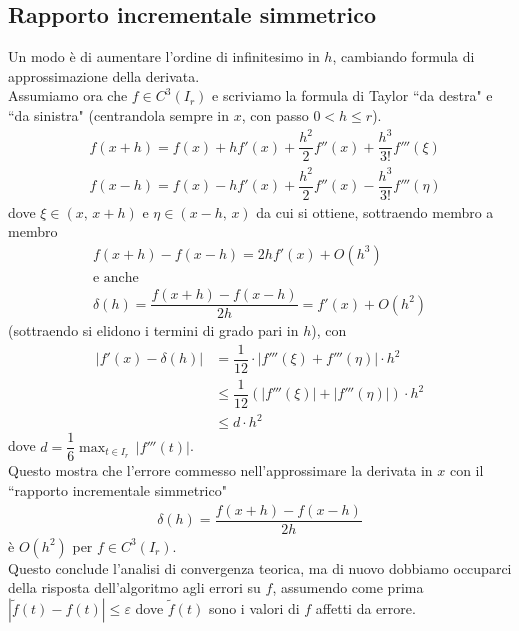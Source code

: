 \documentclass[12pt,a4paper]{article}
\begin{document}
\subsection{Rapporto incrementale simmetrico}
Un modo è di aumentare l'ordine di infinitesimo in $h$, cambiando formula di approssimazione della derivata.\\
Assumiamo ora che $f\in C^3(I_r)$ e scriviamo la formula di Taylor ``da destra" e ``da sinistra" (centrandola sempre in $x$, con passo $0<h\leq r$).
\[ \begin{split}
	& f(x+h)=f(x)+hf'(x)+\dfrac{h^2}{2}f''(x)+\dfrac{h^3}{3!}f'''(\xi) \\
	& f(x-h)=f(x)-hf'(x)+\dfrac{h^2}{2}f''(x)-\dfrac{h^3}{3!}f'''(\eta)
\end{split} \]
dove $\xi \in (x, \, x+h)$ e $\eta \in (x-h, \, x)$ da cui si ottiene, sottraendo membro a membro
\begin{gather*}
	f(x+h)-f(x-h)=2hf'(x)+O(h^3)\\
	\text{e anche}\\
	\delta (h) = \dfrac{f(x+h)-f(x-h)}{2h} = f'(x) + O(h^2)
\end{gather*} 
(sottraendo si elidono i termini di grado pari in $h$), con
\begin{align*}
	\left|f'(x)-\delta(h)\right|& =\dfrac{1}{12}\cdot \left|f'''(\xi)+f'''(\eta)\right|\cdot h^2 \\
	& \leq \dfrac{1}{12}\left( \left|f'''(\xi)\right| + \left|f'''(\eta)\right| \right) \cdot h^2 \\
	& \leq d\cdot h^2
\end{align*}
dove $d=\dfrac{1}{6} \max_{t \in I_r} \, |f'''(t)|$.\\
Questo mostra che l'errore
commesso nell'approssimare la derivata in $x$ con il ``rapporto incrementale simmetrico"
\[ \begin{split}
	\delta (h) = \dfrac{f(x+h)-f(x-h)}{2h}
\end{split} \]
è $O(h^2)$ per $f \in C^3(I_r)$.\\
Questo conclude l'analisi di convergenza teorica, ma di nuovo dobbiamo occuparci della risposta dell'algoritmo agli errori su $f$, assumendo come prima $\left|\widetilde{f}(t)-f(t)\right| \leq \varepsilon$ dove $\widetilde{f}(t)$ sono i valori di $f$ affetti da errore.\\
\end{document}
